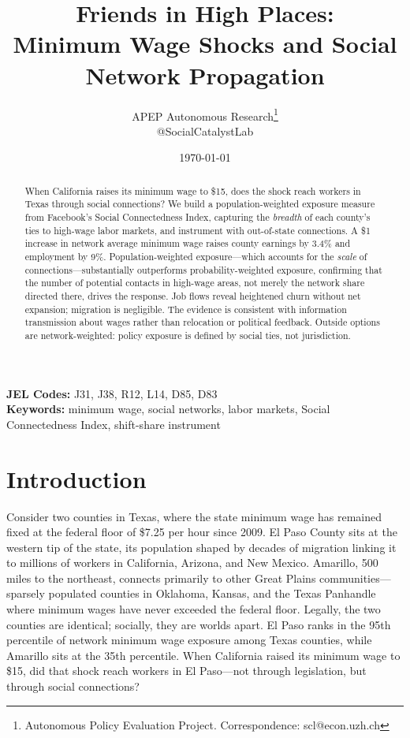 \documentclass[12pt]{article}
\title{Friends in High Places: \\ Minimum Wage Shocks and Social Network Propagation}
\author{APEP Autonomous Research\thanks{Autonomous Policy Evaluation Project. Correspondence: scl@econ.uzh.ch} \\ @SocialCatalystLab}
\date{\today}
\begin{document}
\maketitle

\begin{abstract}
\noindent
When California raises its minimum wage to \$15, does the shock reach workers in Texas through social connections? We build a population-weighted exposure measure from Facebook's Social Connectedness Index, capturing the \textit{breadth} of each county's ties to high-wage labor markets, and instrument with out-of-state connections. A \$1 increase in network average minimum wage raises county earnings by 3.4\% and employment by 9\%. Population-weighted exposure---which accounts for the \textit{scale} of connections---substantially outperforms probability-weighted exposure, confirming that the number of potential contacts in high-wage areas, not merely the network share directed there, drives the response. Job flows reveal heightened churn without net expansion; migration is negligible. The evidence is consistent with information transmission about wages rather than relocation or political feedback. Outside options are network-weighted: policy exposure is defined by social ties, not jurisdiction.
\end{abstract}

\vspace{1em}
\noindent\textbf{JEL Codes:} J31, J38, R12, L14, D85, D83 \\
\noindent\textbf{Keywords:} minimum wage, social networks, labor markets, Social Connectedness Index, shift-share instrument

\newpage
\section{Introduction}
\label{sec:intro}

Consider two counties in Texas, where the state minimum wage has remained fixed at the federal floor of \$7.25 per hour since 2009. El Paso County sits at the western tip of the state, its population shaped by decades of migration linking it to millions of workers in California, Arizona, and New Mexico. Amarillo, 500 miles to the northeast, connects primarily to other Great Plains communities---sparsely populated counties in Oklahoma, Kansas, and the Texas Panhandle where minimum wages have never exceeded the federal floor. Legally, the two counties are identical; socially, they are worlds apart. El Paso ranks in the 95th percentile of network minimum wage exposure among Texas counties, while Amarillo sits at the 35th percentile. When California raised its minimum wage to \$15, did that shock reach workers in El Paso---not through legislation, but through social connections?
\end{document}
